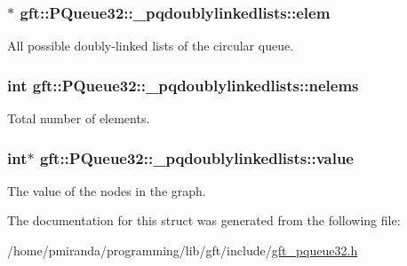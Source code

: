 \subsubsection[{\texorpdfstring{elem}{elem}}]{$\ast$ gft\+::\+P\+Queue32\+::\+\_\+pqdoublylinkedlists\+::elem}\hypertarget{structgft_1_1PQueue32_1_1__pqdoublylinkedlists_aad37a02a88a1d2aad5428a0bd83a42fb}{}\label{structgft_1_1PQueue32_1_1__pqdoublylinkedlists_aad37a02a88a1d2aad5428a0bd83a42fb}


All possible doubly-\/linked lists of the circular queue. 

\subsubsection[{\texorpdfstring{nelems}{nelems}}]{\setlength{\rightskip}{0pt plus 5cm}int gft\+::\+P\+Queue32\+::\+\_\+pqdoublylinkedlists\+::nelems}\hypertarget{structgft_1_1PQueue32_1_1__pqdoublylinkedlists_aac1cff87642f59107cbec2ef52c8be11}{}\label{structgft_1_1PQueue32_1_1__pqdoublylinkedlists_aac1cff87642f59107cbec2ef52c8be11}


Total number of elements. 

\subsubsection[{\texorpdfstring{value}{value}}]{\setlength{\rightskip}{0pt plus 5cm}int$\ast$ gft\+::\+P\+Queue32\+::\+\_\+pqdoublylinkedlists\+::value}\hypertarget{structgft_1_1PQueue32_1_1__pqdoublylinkedlists_a97c614bd8679dc49d6134f1380e173ef}{}\label{structgft_1_1PQueue32_1_1__pqdoublylinkedlists_a97c614bd8679dc49d6134f1380e173ef}


The value of the nodes in the graph. 



The documentation for this struct was generated from the following file\+:\begin{DoxyCompactItemize}
\item 
/home/pmiranda/programming/lib/gft/include/\hyperlink{gft__pqueue32_8h}{gft\+\_\+pqueue32.\+h}\end{DoxyCompactItemize}
